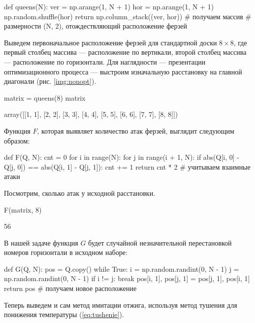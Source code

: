 \begin{pyin}
def queens(N):
  ver = np.arange(1, N + 1)
  hor = np.arange(1, N + 1)
  np.random.shuffle(hor)
  return np.column_stack((ver, hor)) # получаем массив
  # размерности (N, 2), отождествляющий расположение ферзей
\end{pyin}

Выведем первоначальное расположение ферзей для стандартной доски $8 \times 8$, где первый столбец массива — расположение по вертикали, второй столбец массива — расположение по горизонтали. Для наглядности — презентации оптимизационного процесса — выстроим изначальную расстановку на главной диагонали (рис. \ref{img:nonopt}).


\begin{pyin}
matrix = queens(8)
matrix
\end{pyin}

\begin{pyout}
array([[1, 1],
       [2, 2],
       [3, 3],
       [4, 4],
       [5, 5],
       [6, 6],
       [7, 7],
       [8, 8]])
\end{pyout}


Функция $F$, которая выявляет количество атак ферзей, выглядит следующим образом:
\begin{pyin}
def F(Q, N):
  cnt = 0
  for i in range(N):
     for j in range(i + 1, N):
         if abs(Q[i, 0] - Q[j, 0]) == abs(Q[i, 1] - Q[j, 1]):
             cnt += 1
  return cnt * 2 # учитываем взаимные атаки
\end{pyin}

Посмотрим, сколько атак у исходной расстановки.
\begin{pyin}
F(matrix, 8)
\end{pyin}

\begin{pyout}
56
\end{pyout}

В нашей задаче функция $G$ будет случайной незначительной перестановкой номеров горизонтали в исходном наборе:

\begin{pyin}
def G(Q, N):
  pos = Q.copy()
  while True:
     i = np.random.randint(0, N - 1)
     j = np.random.randint(0, N - 1)
     if i != j:
        break
  pos[i, 1], pos[j, 1] = pos[j, 1], pos[i, 1]
  return pos # получаем новое расположение
\end{pyin}

Теперь выведем и сам метод имитации отжига, используя метод тушения для понижения температуры (\ref{eq:tushenie}).

